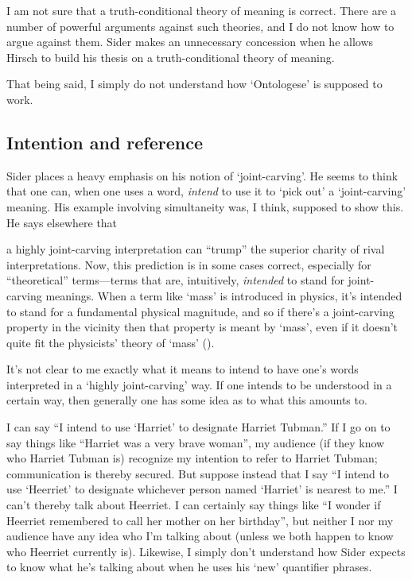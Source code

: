 \documentclass[11pt]{article}
\newenvironment{squote}{%
\begin{spacing}{1}
       	\begin{list}{}{%
\setlength{\labelwidth}{0pt}%
\rightmargin\leftmargin%
}
\item\relax
}{%
\end{list}%
\end{spacing}
}
\begin{document}
\begin{spacing}{1.25}
I am not sure that a truth-conditional theory of meaning is correct.
There are a number of powerful arguments against such theories, and I
do not know how to argue against them.  Sider makes an unnecessary
concession when he allows Hirsch to build his thesis on a
truth-conditional theory of meaning.

That being said, I simply do not understand how `Ontologese' is
supposed to work.

\subsection{Intention and reference}
Sider places a heavy emphasis on his notion of `joint-carving'.  He
seems to think that one can, when one uses a word, {\em intend} to use
it to `pick out' a `joint-carving' meaning.  His example involving
simultaneity was, I think, supposed to show this.  He says elsewhere
that

\begin{squote}
a highly joint-carving interpretation can ``trump'' the superior
charity of rival interpretations.  Now, this prediction is in some
cases correct, especially for ``theoretical'' terms---terms that are,
intuitively, {\em intended} to stand for joint-carving meanings.  When
a term like `mass' is introduced in physics, it's intended to stand
for a fundamental physical magnitude, and so if there's a
joint-carving property in the vicinity then that property is meant by
`mass', even if it doesn't quite fit the physicists' theory of `mass'
(\citeyear[32]{sider2011d}).
\end{squote}

It's not clear to me exactly what it means to intend to have one's
words interpreted in a `highly joint-carving' way.  If one intends to
be understood in a certain way, then generally one has some idea as to
what this amounts to.

I can say ``I intend to use `Harriet' to designate Harriet Tubman.''
If I go on to say things like ``Harriet was a very brave woman'', my
audience (if they know who Harriet Tubman is) recognize my intention
to refer to Harriet Tubman; communication is thereby secured.  But
suppose instead that I say ``I intend to use `Heerriet' to designate
whichever person named `Harriet' is nearest to me.''  I can't thereby
talk about Heerriet.  I can certainly say things like ``I wonder if
Heerriet remembered to call her mother on her birthday'', but neither
I nor my audience have any idea who I'm talking about (unless we both
happen to know who Heerriet currently is).  Likewise, I simply don't
understand how Sider expects to know what he's talking about when he
uses his `new' quantifier phrases.


\end{spacing}
\end{document}
